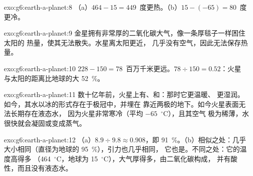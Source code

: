 \begin{solution}{exo:g6:earth-a-planet:8}
（a）$464 - 15 = 449$~度更热。（b）$15 - (-65) = 80$~度更冷。
\end{solution}

\begin{solution}{exo:g6:earth-a-planet:9}
金星拥有非常厚的二氧化碳大气，像一条厚毯子一样困住太阳的
热量，使其无法散失。水星离太阳更近，
几乎没有空气，因此无法保存热量。
\end{solution}

\begin{solution}{exo:g6:earth-a-planet:10}
$228 - 150 = 78$~百万千米更远。$78 \div 150 = 0.52$：火星
与太阳的距离比地球的大 52~\%。
\end{solution}

\begin{solution}{exo:g6:earth-a-planet:11}
数十亿年前，火星上有、和：那时它更温暖、
更湿润。如今，其水以冰的形式存在于极冠中，并埋在
靠近两极的地下。如今火星表面无法长期存在液态水，
因为火星非常寒冷（平均 $-65$~$^\circ$C），且其空气
极为稀薄，水很快就会凝固或变成蒸气。
\end{solution}

\begin{solution}{exo:g6:earth-a-planet:12}
（a）$8.9 \div 9.8 \approx 0.908$，即 91~\%。（b）相似之处：几乎
大小相同（直径为地球的 95~\%），引力也几乎相同，
它也是。不同之处：它的温度高得多
（464~$^\circ$C，地球为 15~$^\circ$C），大气厚得多，由二氧化碳构成，
并有酸性，而且没有液态水。
\end{solution}

